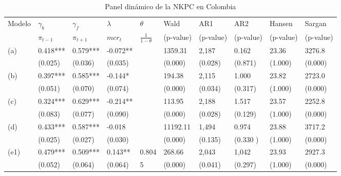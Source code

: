 \begin{table}[H]
\centering
\caption{Panel dinámico de la NKPC en Colombia}
\resizebox{15cm}{!} {
  \begin{tabular}{ p{1.2cm} p{1.2cm} p{1.2cm} p{1.5cm} p{1.2cm} p{1.2cm} p{1.2cm} p{1.2cm} p{1.2cm} p{1.2cm}}
  \hline
  Modelo  & $\gamma_{b}$  & $\gamma_{f}$ & $\lambda$   & $\theta$ &  Wald  &  AR1  &  AR2  & Hansen &  Sargan   \\
  &        $\pi_{t-1}$    &    $\pi_{t+1}$    &   $mcr_{t}$    &   $\frac{1}{1-\theta}$    &  \scriptsize{(p-value)}  &  \scriptsize{(p-value)}  &  \scriptsize{(p-value)}  & \scriptsize{(p-value)} &  \scriptsize{(p-value)}   \\
   \hline
    \hline
   (a) & 0.418*** & 0.579*** & -0.072** &       &   1359.31   &  2,187  &  0.162   & 23.36 &  3276.8    \\
  & \scriptsize{(0.025)} & \scriptsize{(0.036)} & \scriptsize{(0.035)} &       &   \scriptsize{(0.000)}   &   \scriptsize{(0.028)}   &   \scriptsize{(0.871)}   & \scriptsize{(1.000)} &   \scriptsize{(0.000)}    \\
   (b) & 0.397*** & 0.585*** & -0.144* &       &  194.38  &  2,115  &  1.000  & 23.82 &  2723.0   \\
  & \scriptsize{(0.051)} & \scriptsize{(0.070)} & \scriptsize{(0.074)} &       & \scriptsize{(0.000)} & \scriptsize{(0.034)} & \scriptsize{(0.317)} & \scriptsize{(1.000)} & \scriptsize{(0.000)} \\
   (c) & 0.324*** & 0.629*** & -0.214** &       &  113.95  &  2,188  &  1.517  & 23.57 &  2252.8    \\
  & \scriptsize{(0.083)} & \scriptsize{(0.077)} & \scriptsize{(0.090)} &       & \scriptsize{(0.000)} & \scriptsize{(0.028)} & \scriptsize{(0.129)} & \scriptsize{(1.000)} & \scriptsize{(0.000)} \\
   (d) & 0.433*** & 0.587*** & -0.018 &       &  11192.11   &  1,494  &  0.974  & 23.88  &  3717.2    \\
  & \scriptsize{(0.025)} & \scriptsize{(0.027)} & \scriptsize{(0.030)} &       & \scriptsize{(0.000)} & \scriptsize{(0.135)} & \scriptsize{(0.330 )} & \scriptsize{(1.000)} & \scriptsize{(0.000)} \\
   (e1) & 0.479*** & 0.509*** & 0.143** &  0.804  &   268.66  &  2,043  &  1,042  &  23.93 &  2927.3    \\
  & \scriptsize{(0.052)} & \scriptsize{(0.064)} & \scriptsize{(0.064)} & \scriptsize{5}     & \scriptsize{(0.000)} & \scriptsize{(0.041)} & \scriptsize{(0.297)} & \scriptsize{(1.000)} & \scriptsize{(0.000)} \\

\end{tabular}}
\end{table}
